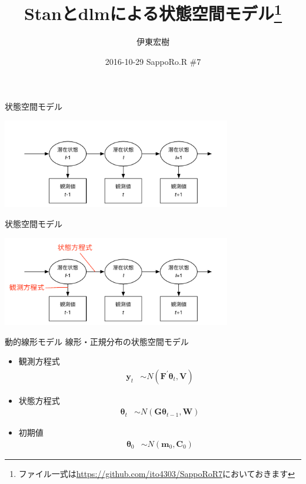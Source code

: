 \documentclass[dvipdfmx,12pt]{beamer}
\begin{document}
\title{Stanとdlmによる状態空間モデル\footnote{ファイル一式は\url{https://github.com/ito4303/SappoRoR7}においておきます}}
\author{伊東宏樹}
\date{2016-10-29 SappoRo.R \#7}
\maketitle

\begin{frame}{状態空間モデル}
  \begin{center}
    \includegraphics[width=10cm]{ssm}
  \end{center}
\end{frame}

\begin{frame}{状態空間モデル}
  \begin{center}
    \includegraphics[width=10cm]{ssm2}
  \end{center}
\end{frame}

\begin{frame}{動的線形モデル}
  線形・正規分布の状態空間モデル

  \begin{itemize}
  \item 観測方程式
    \begin{align*}
      \boldsymbol{y}_t &\sim N(\boldsymbol{F}^{\prime} \boldsymbol{\theta}_t, \boldsymbol{V})
    \end{align*}
  \item 状態方程式
    \begin{align*}
      \boldsymbol{\theta}_t &\sim N(\boldsymbol{G} \boldsymbol{\theta}_{t-1}, \boldsymbol{W})
    \end{align*}
  \item 初期値
    \begin{align*}
      \boldsymbol{\theta}_0 &\sim N(\boldsymbol{m}_0, \boldsymbol{C}_0)
    \end{align*}
  \end{itemize}

\end{frame}
\end{document}
